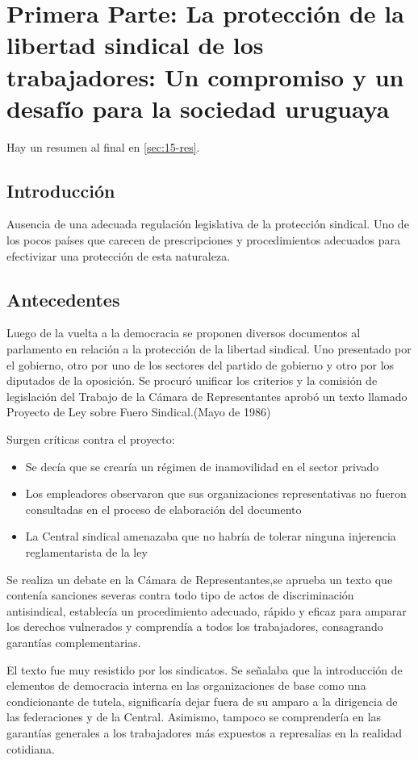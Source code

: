 \documentclass[spanish,12pt,a4paper,titlepage]{report}
\begin{document}
\section{Primera Parte: La protección de la libertad sindical de los trabajadores: Un compromiso y un desafío para la sociedad uruguaya}

Hay un resumen al final en \ref{sec:15-res}.

\subsection{Introducción}

Ausencia de una adecuada regulación legislativa de la protección sindical.
Uno de los pocos países que carecen de prescripciones y procedimientos adecuados para efectivizar una protección de esta naturaleza.

\subsection{Antecedentes}
Luego de la vuelta a la democracia se proponen diversos documentos al parlamento en relación a la protección de la libertad sindical. Uno presentado por el gobierno, otro por uno de los sectores del partido de gobierno y otro por los diputados de la oposición. Se procuró unificar los criterios y la comisión de legislación del Trabajo de la Cámara de Representantes aprobó un texto llamado Proyecto de Ley sobre Fuero Sindical.(Mayo de 1986)

Surgen críticas contra el proyecto:
\begin{itemize}
\item Se decía que se crearía un régimen de inamovilidad en el sector privado
\item Los empleadores observaron que sus organizaciones representativas no fueron consultadas en el proceso de elaboración del documento
\item La Central sindical amenazaba que no habría de tolerar ninguna injerencia reglamentarista de la ley
\end{itemize}

Se realiza un debate en la Cámara de Representantes,se aprueba un texto que contenía sanciones severas contra todo tipo de actos de discriminación antisindical, establecía un procedimiento adecuado, rápido y eficaz para amparar los derechos vulnerados y comprendía a todos los trabajadores, consagrando garantías complementarias.

El texto fue muy resistido por los sindicatos. Se señalaba que la introducción de elementos de democracia interna en las organizaciones de base como una condicionante de tutela, significaría dejar fuera de su amparo a la dirigencia de las federaciones y de la Central. Asimismo, tampoco se comprendería en las garantías generales a los trabajadores más expuestos a represalias en la realidad cotidiana.
\end{document}
